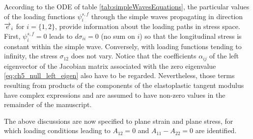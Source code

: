 According to the ODE of table \ref{tab:simpleWavesEquations}, the particular values of the loading functions $\psi_i^{s,f}$ through the simple waves propagating in direction ${\overrightarrow{e}}_i$ for $i=\{1,2\}$, provide information about the loading paths in stress space.
First, $\psi^{s,f}_i =0$ leads to $d\sigma_{ii}=0$ (no sum on $i$) so that the longitudinal stress is constant within the simple wave.
Conversely, with loading functions tending to infinity, the stress $\sigma_{12}$ does not vary.
Notice that the coefficients $\alpha_{ij}$ of the left eigenvector of the Jacobian matrix associated with the zero eigenvalue \eqref{eq:ch5_null_left_eigen} also have to be regarded.
Nevertheless, those terms resulting from products of the components of the elastoplastic tangent modulus have complex expressions and are assumed to have non-zero values in the remainder of the manuscript.

The above discussions are now specified to plane strain and plane stress, for which loading conditions leading to $A_{12} =0$ and $A _{11}-A _{22}=0$ are identified.




